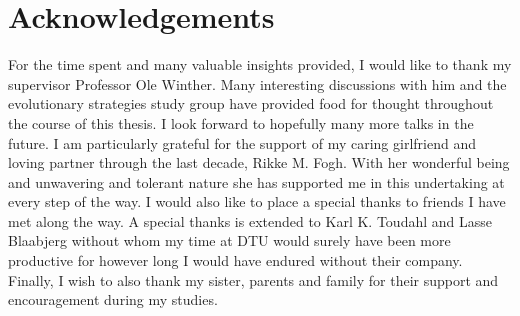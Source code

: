 
\chapter{Acknowledgements}
For the time spent and many valuable insights provided, I would like to thank my supervisor Professor Ole Winther. Many interesting discussions with him and the evolutionary strategies study group have provided food for thought throughout the course of this thesis. I look forward to hopefully many more talks in the future.
\newline
\newline
I am particularly grateful for the support of my caring girlfriend and loving partner through the last decade, Rikke M. Fogh. With her wonderful being and unwavering and tolerant nature she has supported me in this undertaking at every step of the way. 
\newline
\newline
I would also like to place a special thanks to friends I have met along the way. A special thanks is extended to Karl K. Toudahl and Lasse Blaabjerg without whom my time at DTU would surely have been more productive for however long I would have endured without their company.
\newline
\newline
Finally, I wish to also thank my sister, parents and family for their support and encouragement during my studies.

